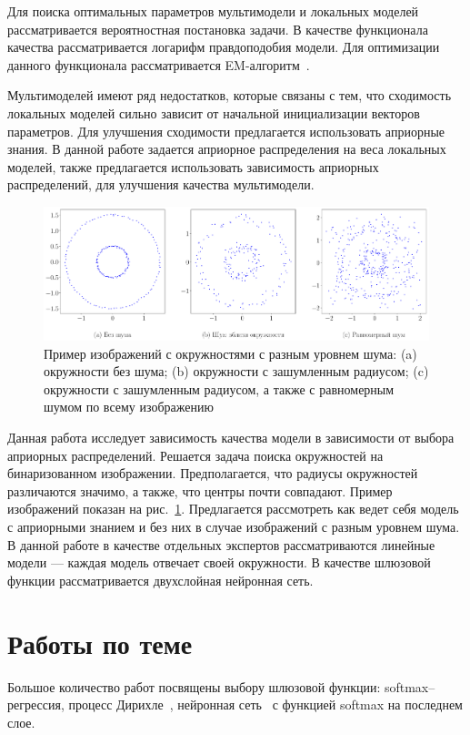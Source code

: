 \documentclass[12pt, twoside]{article}
\numberwithin{equation}{section}
\begin{document}
Для поиска оптимальных параметров мультимодели и локальных моделей рассматривается вероятностная постановка задачи. В качестве функционала качества рассматривается логарифм правдоподобия модели. Для оптимизации данного функционала рассматривается EM-алгоритм~\cite{Dempster1977}.

Мультимоделей имеют ряд недостатков, которые связаны с тем, что сходимость локальных моделей сильно зависит от начальной инициализации векторов параметров. Для улучшения сходимости предлагается использовать априорные знания. В данной работе задается априорное распределения на веса локальных моделей, также предлагается использовать зависимость априорных распределений, для улучшения качества мультимодели. 

\begin{figure}[h!t]\center
\includegraphics[width=1\textwidth]{result/statment}
\caption{Пример изображений с окружностями с разным уровнем шума: (a) окружности без шума; (b) окружности с зашумленным радиусом; (c) окружности с зашумленным радиусом, а также с равномерным шумом по всему изображению}
\label{example:1}
\end{figure}

Данная работа исследует зависимость качества модели в зависимости от выбора априорных распределений. Решается задача поиска окружностей на бинаризованном изображении. Предполагается, что радиусы окружностей различаются значимо, а также, что центры почти совпадают. Пример изображений показан на рис.~\ref{example:1}. Предлагается рассмотреть как ведет себя модель с априорными знанием и без них в случае изображений с разным уровнем шума. В данной работе в качестве отдельных экспертов рассматриваются линейные модели --- каждая модель отвечает своей окружности. В качестве шлюзовой функции рассматривается двухслойная нейронная сеть.

\section{Работы по теме}
Большое количество работ посвящены выбору шлюзовой функции: softmax--регрессия, процесс Дирихле~\cite{Edward2002}, нейронная сеть~\cite{Shazeer2017} с функцией softmax на последнем слое.
\end{document}
